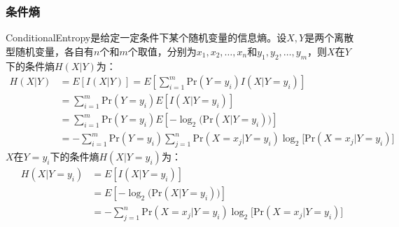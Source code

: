 \subsubsection{条件熵}
\begin{definition}
	\gls{ConditionalEntropy}是给定一定条件下某个随机变量的信息熵。设$X,Y$是两个离散型随机变量，各自有$n$个和$m$个取值，分别为$x_1,x_2,\dots,x_n$和$y_1,y_2,\dots,y_m$，则$X$在$Y$下的条件熵$H(X|Y)$为：
	\begin{align*}
		H(X|Y)
		&=E[I(X|Y)]=E\left[\sum_{i=1}^m\mathrm{Pr}(Y=y_i)I(X|Y=y_i)\right] \\
		&=\sum_{i=1}^m\mathrm{Pr}(Y=y_i)E\left[I(X|Y=y_i)\right] \\
		&=\sum_{i=1}^m\mathrm{Pr}(Y=y_i)E\left[-\log_2\Big(\mathrm{Pr}(X|Y=y_i)\Big)\right] \\
		&=-\sum_{i=1}^m\mathrm{Pr}(Y=y_i)\sum_{j=1}^n\mathrm{Pr}(X=x_j|Y=y_i)\log_2\Big[\mathrm{Pr}(X=x_j|Y=y_i)\Big]
	\end{align*}
	$X$在$Y=y_i$下的条件熵$H(X|Y=y_i)$为：
	\begin{align*}
		H(X|Y=y_i)&=E[I(X|Y=y_i)] \\
		&=E\left[-\log_2\Big(\mathrm{Pr}(X|Y=y_i)\Big)\right] \\
		&=-\sum_{j=1}^n\mathrm{Pr}(X=x_j|Y=y_i)\log_2\Big[\mathrm{Pr}(X=x_j|Y=y_i)\Big]
	\end{align*}
\end{definition}